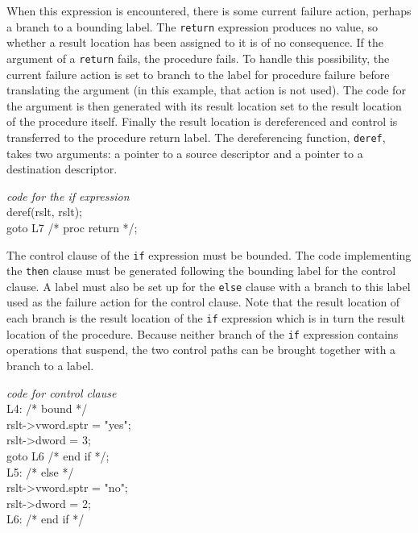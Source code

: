 
\noindent
When this expression is encountered, there is some current failure
action, perhaps a branch to a bounding label. The \texttt{return}
expression produces no value, so whether a result location has been
assigned to it is of no consequence. If the argument of a
\texttt{return} fails, the procedure fails. To handle this
possibility, the current failure action is set to branch to the label
for procedure failure before translating the argument (in this
example, that action is not used).  The code for the argument is then
generated with its result location set to the result location of the
procedure itself. Finally the result location is dereferenced and
control is transferred to the procedure return label. The
dereferencing function, \texttt{deref}, takes two arguments: a pointer
to a source descriptor and a pointer to a destination descriptor.

\goodbreak
\begin{iconcode}
\>\>\textit{code for the if expression }\\
\>\>deref(rslt, rslt);\\
\>\>goto L7 /* proc return */;\\
\end{iconcode}


The control clause of the \texttt{if} expression must be bounded. The
code implementing the \texttt{then} clause must be generated following
the bounding label for the control clause. A label must also be set up
for the \texttt{else} clause with a branch to this label used as the
failure action for the control clause. Note that the result location
of each branch is the result location of the \texttt{if} expression
which is in turn the result location of the procedure. Because neither
branch of the \texttt{if} expression contains operations that suspend,
the two control paths can be brought together with a branch to a
label.

\goodbreak
\begin{iconcode}
\>\>\textit{code for control clause}\\
\>L4: /* bound */\\
\>\>rslt->vword.sptr = "yes";\\
\>\>rslt->dword = 3;\\
\>\>goto L6 /* end if */;\\
\>L5: /* else */\\
\>\>rslt->vword.sptr = "no";\\
\>\>rslt->dword = 2;\\
\>L6: /* end if */\\
\end{iconcode}

